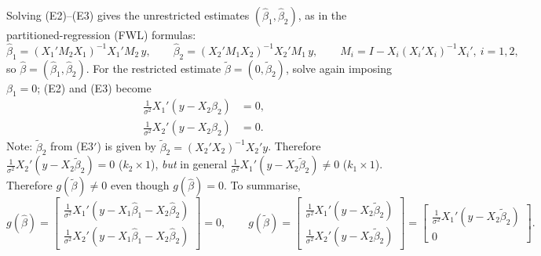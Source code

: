 \documentclass[11pt]{article}
\begin{document}
Solving (E2)--(E3) gives the unrestricted estimates $(\hat\beta_{1},\hat\beta_{2})$, as in the
partitioned-regression (FWL) formulas:
\[ \hat\beta_{1}=(X_{1}'M_{2}X_{1})^{-1}X_{1}'M_{2}\,y,\qquad
   \hat\beta_{2}=(X_{2}'M_{1}X_{2})^{-1}X_{2}'M_{1}\,y,\qquad
   M_{i}=I-X_{i}(X_{i}'X_{i})^{-1}X_{i}',\ i=1,2, \]
so $\hat\beta=(\hat\beta_{1},\hat\beta_{2})$. For the restricted estimate $\tilde\beta=(0,\tilde\beta_{2})$,
solve again imposing $\beta_{1}=0$; (E2) and (E3) become
\begin{align}
 \tfrac1{\sigma^{2}}X_{1}'(y-X_{2}\beta_{2})&=0, \tag{E2$'$}\\
 \tfrac1{\sigma^{2}}X_{2}'(y-X_{2}\beta_{2})&=0. \tag{E3$'$}
\end{align}
Note: $\tilde\beta_{2}$ from (E3$'$) is given by $\tilde\beta_{2}=(X_{2}'X_{2})^{-1}X_{2}'y$. Therefore
$\frac1{\sigma^{2}}X_{2}'(y-X_{2}\tilde\beta_{2})=0$ ($k_{2}\times1$), \emph{but} in general
$\frac1{\sigma^{2}}X_{1}'(y-X_{2}\tilde\beta_{2})\neq0$ ($k_{1}\times1$). Therefore $g(\tilde\beta)\neq0$ even
though $g(\hat\beta)=0$. To summarise,
\[ g(\hat\beta)=\begin{bmatrix}\frac1{\sigma^{2}}X_{1}'(y-X_{1}\hat\beta_{1}-X_{2}\hat\beta_{2})\\[3pt]
                              \frac1{\sigma^{2}}X_{2}'(y-X_{1}\hat\beta_{1}-X_{2}\hat\beta_{2})\end{bmatrix}=0,
   \qquad
   g(\tilde\beta)=\begin{bmatrix}\frac1{\sigma^{2}}X_{1}'(y-X_{2}\tilde\beta_{2})\\[3pt]
                                \frac1{\sigma^{2}}X_{2}'(y-X_{2}\tilde\beta_{2})\end{bmatrix}
   =\begin{bmatrix}\frac1{\sigma^{2}}X_{1}'(y-X_{2}\tilde\beta_{2})\\[3pt]0\end{bmatrix}. \]
\end{document}
